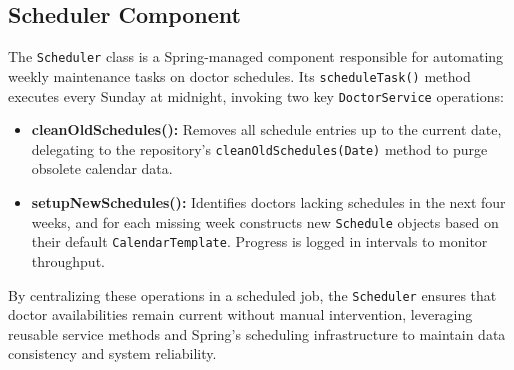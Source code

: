 \subsection{Scheduler Component}
The \texttt{Scheduler} class is a Spring-managed component responsible for automating weekly maintenance tasks on doctor schedules. Its \texttt{scheduleTask()} method executes every Sunday at midnight, invoking two key \texttt{DoctorService} operations:
\begin{itemize}
	\item \textbf{cleanOldSchedules():} Removes all schedule entries up to the current date, delegating to the repository’s \texttt{cleanOldSchedules(Date)} method to purge obsolete calendar data.
	\item \textbf{setupNewSchedules():} Identifies doctors lacking schedules in the next four weeks, and for each missing week constructs new \texttt{Schedule} objects based on their default \texttt{CalendarTemplate}. Progress is logged in intervals to monitor throughput.
\end{itemize}

By centralizing these operations in a scheduled job, the \texttt{Scheduler} ensures that doctor availabilities remain current without manual intervention, leveraging reusable service methods and Spring’s scheduling infrastructure to maintain data consistency and system reliability.


